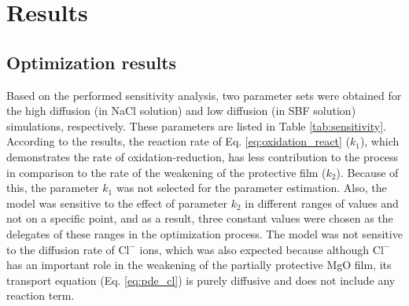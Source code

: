 \section{Results}

\subsection{Optimization results}

Based on the performed sensitivity analysis, two parameter sets were obtained for the high diffusion (in NaCl solution) and low diffusion (in SBF solution) simulations, respectively. These parameters are listed in Table \ref{tab:sensitivity}. According to the results, the reaction rate of  Eq. \ref{eq:oxidation_react} ($k_1$), which demonstrates the rate of oxidation-reduction, has less contribution to the process in comparison to the rate of the weakening of the protective film ($k_2$). Because of this, the parameter $k_1$ was not selected for the parameter estimation. Also, the model was sensitive to the effect of parameter $k_2$ in different ranges of values and not on a specific point, and as a result, three constant values were chosen as the delegates of these ranges in the optimization process. The model was not sensitive to the diffusion rate of $\mathrm{Cl}^{-}$ ions, which was also expected because although $\mathrm{Cl}^{-}$ has an important role in the weakening of the partially protective MgO film, its transport equation (Eq. \ref{eq:pde_cl}) is purely diffusive and does not include any reaction term.


